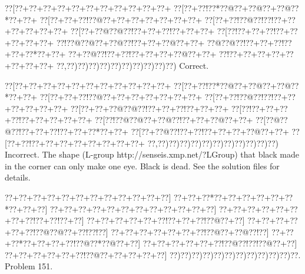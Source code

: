 \documentclass[a5paper]{article}
\begin{document}
\begin{center}
{\goo
\0??[\0??+\0??+\0??+\0??+\0??+\0??+\0??+\0??+\0??+\0??+\0??+
\0??[\0??+\0??!\0??*\0??@\0??+\0??@\0??+\0??@\0??*\0??+\0??+
\0??[\0??+\0??+\0??!\0??@\0??+\0??+\0??+\0??+\0??+\0??+\0??+
\0??[\0??+\0??!\0??@\0??!\0??!\0??+\0??+\0??+\0??+\0??+\0??+
\0??[\0??+\0??@\0??@\0??!\0??+\0??+\0??!\0??+\0??+\0??+
\0??[\0??!\0??+\0??+\0??!\0??+\0??+\0??+\0??+\0??+
\0??!\0??@\0??@\0??+\0??@\0??!\0??+\0??+\0??@\0??+\0??+
\0??@\0??@\0??!\0??+\0??+\0??!\0??+\0??+\0??*\0??+\0??+
\0??+\0??@\0??!\0??+\0??!\0??+\0??+\0??+\0??@\0??+\0??+
\0??!\0??+\0??+\0??+\0??+\0??+\0??+\0??+\0??+
\0??,\0??)\0??)\0??)\0??)\0??)\0??)\0??)\0??)\0??)\0??)
}
Correct. 

\end{center}
\begin{center}
{\goo
\0??[\0??+\0??+\0??+\0??+\0??+\0??+\0??+\0??+\0??+\0??+\0??+
\0??[\0??+\0??!\0??*\0??@\0??+\0??@\0??+\0??@\0??*\0??+\0??+
\0??[\0??+\0??+\0??!\0??@\0??+\0??+\0??+\0??+\0??+\0??+\0??+
\0??[\0??+\0??!\0??@\0??!\0??!\0??+\0??+\0??+\0??+\0??+\0??+
\0??[\0??+\0??+\0??@\0??@\0??!\0??+\0??+\0??!\0??+\0??+\0??+
\0??[\0??!\0??+\0??+\0??+\0??!\0??+\0??+\0??+\0??+\0??+
\0??[\0??!\0??@\0??@\0??+\0??@\0??!\0??+\0??+\0??@\0??+\0??+
\0??[\0??@\0??@\0??!\0??+\0??+\0??!\0??+\0??+\0??*\0??+\0??+
\0??[\0??+\0??@\0??!\0??+\0??!\0??+\0??+\0??+\0??@\0??+\0??+
\0??[\0??+\0??!\0??+\0??+\0??+\0??+\0??+\0??+\0??+\0??+
\0??,\0??)\0??)\0??)\0??)\0??)\0??)\0??)\0??)\0??)\0??)\0??)
}
Incorrect. The shape (L-group http://senseis.xmp.net/?LGroup) that black made in the corner can only make one eye. Black is dead. See the solution files for details.

\end{center}
\newpage
\begin{center}
{\goo
\0??+\0??+\0??+\0??+\0??+\0??+\0??+\0??+\0??+\0??+\0??+\0??]
\0??+\0??+\0??*\0??+\0??+\0??+\0??+\0??+\0??*\0??+\0??+\0??]
\0??+\0??+\0??+\0??+\0??+\0??+\0??+\0??+\0??+\0??+\0??+\0??]
\0??+\0??+\0??+\0??+\0??+\0??+\0??+\0??!\0??+\0??!\0??+\0??]
\0??+\0??+\0??+\0??+\0??+\0??!\0??+\0??+\0??!\0??@\0??+\0??]
\0??+\0??+\0??+\0??+\0??+\0??!\0??@\0??@\0??+\0??!\0??!\0??]
\0??+\0??+\0??+\0??+\0??+\0??+\0??!\0??@\0??+\0??@\0??!\0??]
\0??+\0??+\0??*\0??+\0??+\0??+\0??!\0??@\0??*\0??@\0??+\0??]
\0??+\0??+\0??+\0??+\0??+\0??!\0??@\0??!\0??!\0??@\0??+\0??]
\0??+\0??+\0??+\0??+\0??+\0??!\0??@\0??+\0??+\0??+\0??+\0??]
\0??)\0??)\0??)\0??)\0??)\0??)\0??)\0??)\0??)\0??)\0??)\0??.
}
Problem 151.

\end{center}
\end{document}
